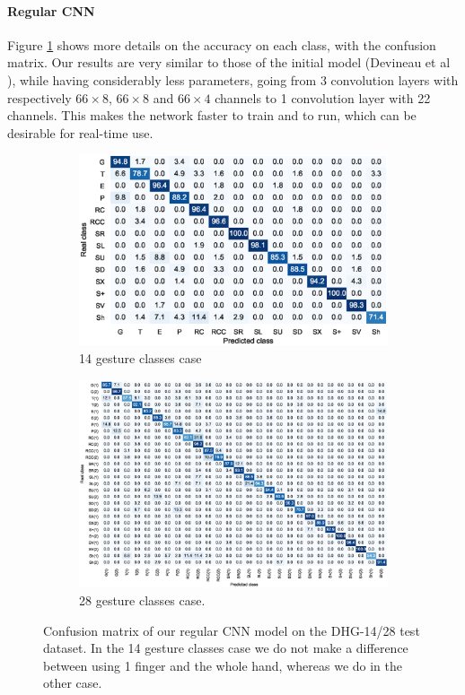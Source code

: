 \documentclass{article}
\begin{document}
\paragraph{Regular CNN}
Figure \ref{fig:confusion-matrix} shows more details on the accuracy on each class, with the confusion matrix.
Our results are very similar to those of the initial model (Devineau et al \cite{Devineau}), while having considerably less parameters, going from 3 convolution layers with respectively $66\times 8$, $66\times 8$ and $66\times 4$ channels to 1 convolution layer with 22 channels. This makes the network faster to train and to run, which can be desirable for real-time use.
\begin{figure}
    \centering
    \begin{subfigure}{0.6\linewidth}
        \includegraphics[width=\linewidth]{img/confusion-matrix-14-relative.eps}
        \caption{14 gesture classes case}
    \end{subfigure}
    \begin{subfigure}{\linewidth}
        \includegraphics[width=\linewidth]{img/confusion-matrix-28-relative.eps}
        \caption{28 gesture classes case.}
    \end{subfigure}
    \caption{Confusion matrix of our regular CNN model on the DHG-14/28 test dataset. In the 14 gesture classes case we do not make a difference between using 1 finger and the whole hand, whereas we do in the other case.}
    \label{fig:confusion-matrix}
\end{figure}
\end{document}
